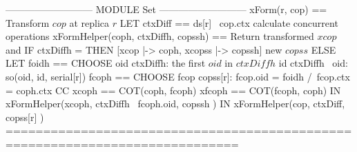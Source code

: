 \documentclass[preview, border={5pt 0pt 32pt 1pt}]{standalone}
\newcommand{\cc}{\textsc{CC}}
\begin{document}
\begin{tla}
--------------------------- MODULE Set ---------------------------
xForm(r, cop) == \* Transform $cop$ at replica $r$
    LET ctxDiff == ds[r] \ cop.ctx \* calculate concurrent operations
        xFormHelper(coph, ctxDiffh, copssh) == \* Return transformed $xcop$ and
            IF ctxDiffh = {} THEN [xcop |-> coph, xcopss |-> copssh]  \* new $copss$ 
            ELSE LET foidh == CHOOSE oid \in ctxDiffh: \* the first $oid$ in $ctxDiffh$ 
                                \A id \in ctxDiffh \ {oid}: so(oid, id, serial[r]) 
                     fcoph == CHOOSE fcop \in copss[r]: 
                                fcop.oid = foidh /\ fcop.ctx = coph.ctx \* \cc
                     xcoph == COT(coph, fcoph)    xfcoph == COT(fcoph, coph)
                 IN  xFormHelper(xcoph, ctxDiffh \ {fcoph.oid}, 
                                        copssh )
    IN  xFormHelper(cop, ctxDiff, copss[r] ) 
=============================================================================
\end{tla}
\begin{tlatex}
\@x{}\moduleLeftDash{}\moduleRightDash\@xx{}%
%
%
\@xx{}%
%
\@xx{}%
%
%
\@xx{}%
%
\@xx{}%
%
\@xx{}%
%
\@y{%
  \cc
}%
\@xx{}%
%
\@x{}\bottombar\@xx{}%
\end{tlatex}
\end{document}
